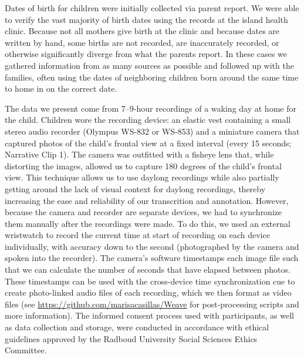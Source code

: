 \documentclass[,man,floatsintext]{apa6}
\begin{document}
Dates of birth for children were initially collected via parent report.
We were able to verify the vast majority of birth dates using the
records at the island health clinic. Because not all mothers give birth
at the clinic and because dates are written by hand, some births are not
recorded, are inaccurately recorded, or otherwise significantly diverge
from what the parents report. In these cases we gathered information
from as many sources as possible and followed up with the families,
often using the dates of neighboring children born around the same time
to home in on the correct date.

The data we present come from 7--9-hour recordings of a waking day at
home for the child. Children wore the recording device: an elastic vest
containing a small stereo audio recorder (Olympus WS-832 or WS-853) and
a miniature camera that captured photos of the child's frontal view at a
fixed interval (every 15 seconds; Narrative Clip 1). The camera was
outfitted with a fisheye lens that, while distorting the images, allowed
us to capture 180 degrees of the child's frontal view. This technique
allows us to use daylong recordings while also partially getting around
the lack of visual context for daylong recordings, thereby increasing
the ease and reliability of our transcrition and annotation. However,
because the camera and recorder are separate devices, we had to
synchronize them manually after the recordings were made. To do this, we
used an external wristwatch to record the current time at start of
recording on each device individually, with accuracy down to the second
(photographed by the camera and spoken into the recorder). The camera's
software timestamps each image file such that we can calculate the
number of seconds that have elapsed between photos. These timestamps can
be used with the cross-device time synchronization cue to create
photo-linked audio files of each recording, which we then format as
video files (see \url{https://github.com/marisacasillas/Weave} for
post-processing scripts and more information). The informed consent
process used with participants, as well as data collection and storage,
were conducted in accordance with ethical guidelines approved by the
Radboud University Social Sciences Ethics Committee.
\end{document}

